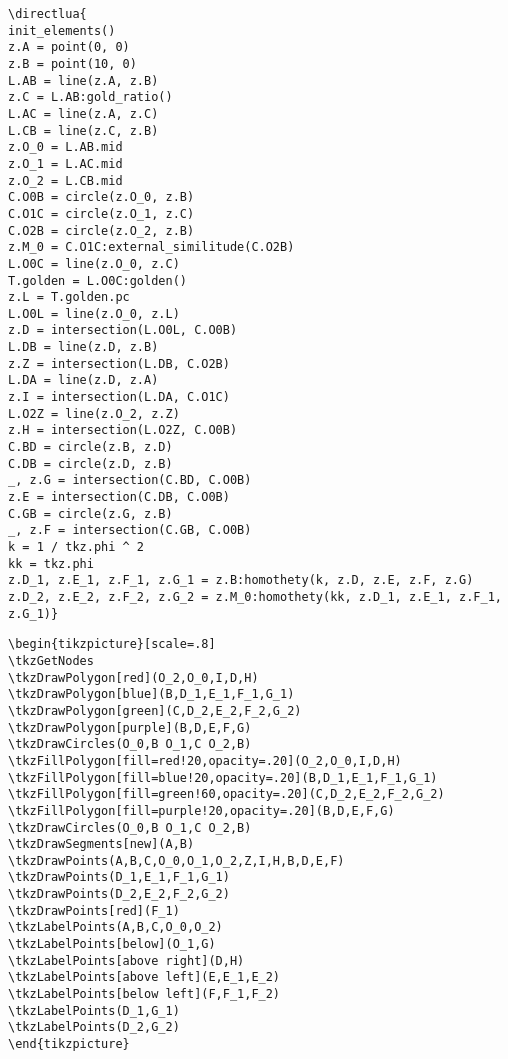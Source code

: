 \begin{verbatim}
\directlua{
init_elements()
z.A = point(0, 0)
z.B = point(10, 0)
L.AB = line(z.A, z.B)
z.C = L.AB:gold_ratio()
L.AC = line(z.A, z.C)
L.CB = line(z.C, z.B)
z.O_0 = L.AB.mid
z.O_1 = L.AC.mid
z.O_2 = L.CB.mid
C.O0B = circle(z.O_0, z.B)
C.O1C = circle(z.O_1, z.C)
C.O2B = circle(z.O_2, z.B)
z.M_0 = C.O1C:external_similitude(C.O2B)
L.O0C = line(z.O_0, z.C)
T.golden = L.O0C:golden()
z.L = T.golden.pc
L.O0L = line(z.O_0, z.L)
z.D = intersection(L.O0L, C.O0B)
L.DB = line(z.D, z.B)
z.Z = intersection(L.DB, C.O2B)
L.DA = line(z.D, z.A)
z.I = intersection(L.DA, C.O1C)
L.O2Z = line(z.O_2, z.Z)
z.H = intersection(L.O2Z, C.O0B)
C.BD = circle(z.B, z.D)
C.DB = circle(z.D, z.B)
_, z.G = intersection(C.BD, C.O0B)
z.E = intersection(C.DB, C.O0B)
C.GB = circle(z.G, z.B)
_, z.F = intersection(C.GB, C.O0B)
k = 1 / tkz.phi ^ 2
kk = tkz.phi
z.D_1, z.E_1, z.F_1, z.G_1 = z.B:homothety(k, z.D, z.E, z.F, z.G)
z.D_2, z.E_2, z.F_2, z.G_2 = z.M_0:homothety(kk, z.D_1, z.E_1, z.F_1, z.G_1)}
\end{verbatim}

\begin{verbatim}
\begin{tikzpicture}[scale=.8]
\tkzGetNodes
\tkzDrawPolygon[red](O_2,O_0,I,D,H)
\tkzDrawPolygon[blue](B,D_1,E_1,F_1,G_1)
\tkzDrawPolygon[green](C,D_2,E_2,F_2,G_2)
\tkzDrawPolygon[purple](B,D,E,F,G)
\tkzDrawCircles(O_0,B O_1,C O_2,B)
\tkzFillPolygon[fill=red!20,opacity=.20](O_2,O_0,I,D,H)
\tkzFillPolygon[fill=blue!20,opacity=.20](B,D_1,E_1,F_1,G_1)
\tkzFillPolygon[fill=green!60,opacity=.20](C,D_2,E_2,F_2,G_2)
\tkzFillPolygon[fill=purple!20,opacity=.20](B,D,E,F,G)
\tkzDrawCircles(O_0,B O_1,C O_2,B)
\tkzDrawSegments[new](A,B)
\tkzDrawPoints(A,B,C,O_0,O_1,O_2,Z,I,H,B,D,E,F)
\tkzDrawPoints(D_1,E_1,F_1,G_1)
\tkzDrawPoints(D_2,E_2,F_2,G_2)
\tkzDrawPoints[red](F_1)
\tkzLabelPoints(A,B,C,O_0,O_2)
\tkzLabelPoints[below](O_1,G)
\tkzLabelPoints[above right](D,H)
\tkzLabelPoints[above left](E,E_1,E_2)
\tkzLabelPoints[below left](F,F_1,F_2)
\tkzLabelPoints(D_1,G_1)
\tkzLabelPoints(D_2,G_2)
\end{tikzpicture}
\end{verbatim}

